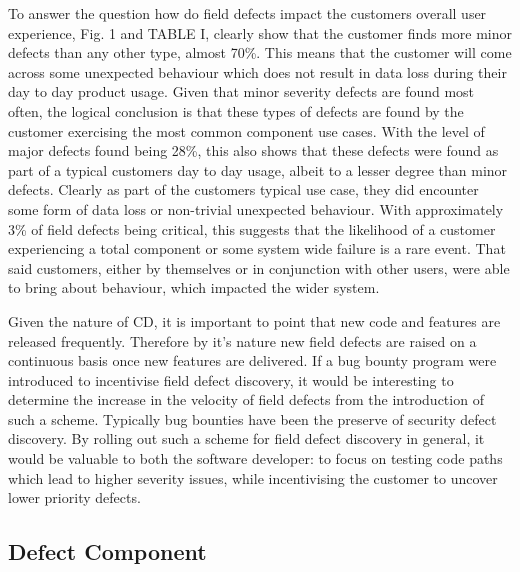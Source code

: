 \documentclass[conference]{IEEEtran}
\begin{document}
To answer the question how do field defects impact the customers overall user experience, Fig. 1 and TABLE I, clearly show that the customer finds more minor defects than any other type, almost 70\%. This means that the customer will come across some unexpected behaviour which does not result in data loss during their day to day product usage. Given that minor severity defects are found most often, the logical conclusion is that these types of defects are found by the customer exercising the most common component use cases. With the level of major defects found being 28\%, this also shows that these defects were found as part of a typical customers day to day usage, albeit to a lesser degree than minor defects. Clearly as part of the customers typical use case, they did encounter some form of data loss or non-trivial unexpected behaviour. With approximately 3\% of field defects being critical, this suggests that the likelihood of a customer experiencing a total component or some system wide failure is a rare event. That said customers, either by themselves or in conjunction with other users, were able to bring about behaviour, which impacted the wider system. \par
Given the nature of CD, it is important to point that new code and features are released frequently. Therefore by it's nature new field defects are raised on a continuous basis once new features are delivered. If a bug bounty program were introduced to incentivise field defect discovery, it would be interesting to determine the increase in the velocity of field defects from the introduction of such a scheme. Typically bug bounties have been the preserve of security defect discovery. By rolling out such a scheme for field defect discovery in general, it would be valuable to both the software developer: to focus on testing code paths which lead to higher severity issues, while incentivising the customer to uncover lower priority defects.

\subsection{Defect Component}
\end{document}
